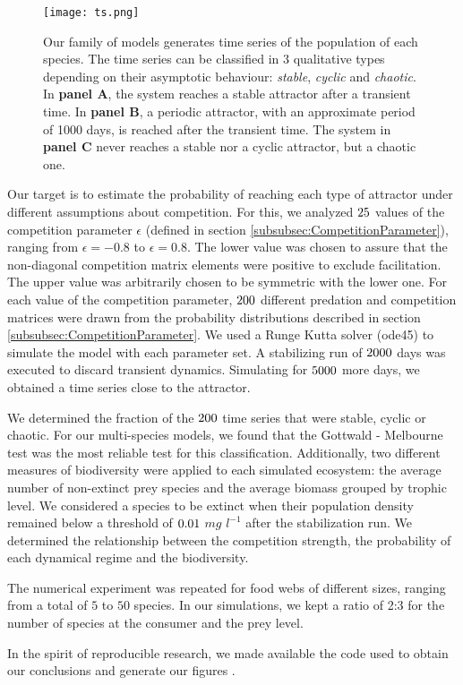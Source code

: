 \begin{figure}
	\begin{center}
		\texttt{[image: ts.png]}
	\end{center}
	\caption{Our family of models generates time series of the population of each species. The time series can be classified in $3$ qualitative types depending on their asymptotic behaviour: \textit{stable}, \textit{cyclic} and \textit{chaotic}. In \textbf{panel A}, the system reaches a stable attractor after a transient time. In \textbf{panel B}, a periodic attractor, with an approximate period of 1000 days, is reached after the transient time. The system in \textbf{panel C} never reaches a stable nor a cyclic attractor, but a chaotic one.}
	\label{fig:TimeSeries}
\end{figure}

Our target is to estimate the probability of reaching each type of attractor under different assumptions about competition. For this, we analyzed $25$ values of the competition parameter $\epsilon$ (defined in section \ref{subsubsec:CompetitionParameter}), ranging from $\epsilon = -0.8$ to $\epsilon = 0.8$. The lower value was chosen to assure that the non-diagonal competition matrix elements were positive to exclude facilitation. The upper value was arbitrarily chosen to be symmetric with the lower one. For each value of the competition parameter, $200$ different predation and competition matrices were drawn from the probability distributions described in section \ref{subsubsec:CompetitionParameter}. We used a Runge Kutta solver (ode45) to simulate the model with each parameter set. A stabilizing run of $ 2000 $ days was executed to discard transient dynamics. Simulating for $ 5000 $ more days, we obtained a time series close to the attractor.

We determined the fraction of the $200$ time series that were stable, cyclic or chaotic.  For our multi-species models, we found that the Gottwald - Melbourne test \citep{Gottwald2009} was the most reliable test for this classification.  Additionally, two different measures of biodiversity were applied to each simulated ecosystem: the average number of non-extinct prey species and the average biomass grouped by trophic level. We considered a species to be extinct when their population density remained below a threshold of $0.01$ $mg$ $l^{-1}$ after the stabilization run. We determined the relationship between the competition strength, the probability of each dynamical regime and the biodiversity.

The numerical experiment was repeated for food webs of different sizes, ranging from a total of $5$ to $50$ species. In our simulations, we kept a ratio of 2:3 for the number of species at the consumer and the prey level.

In the spirit of reproducible research, we made available the code used to obtain our conclusions and generate our figures \citep{Rodriguez-Sanchez-code-neuchaos}.